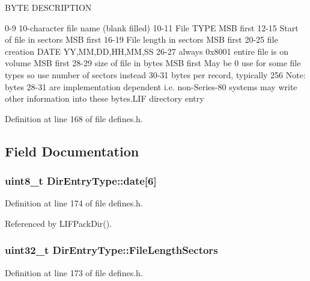 B\+Y\+TE D\+E\+S\+C\+R\+I\+P\+T\+I\+ON 

 0-\/9 10-\/character file name (blank filled) 10-\/11 File T\+Y\+PE M\+SB first 12-\/15 Start of file in sectors M\+SB first 16-\/19 File length in sectors M\+SB first 20-\/25 file creation D\+A\+TE YY,MM,DD,HH,MM,SS 26-\/27 always 0x8001 entire file is on volume M\+SB first 28-\/29 size of file in bytes M\+SB first May be 0 use for some file types so use number of sectors instead 30-\/31 bytes per record, typically 256 Note\+: bytes 28-\/31 are implementation dependent i.\+e. non-\/\+Series-\/80 systems may write other information into these bytes.\+L\+IF directory entry 

Definition at line 168 of file defines.\+h.



\subsection{Field Documentation}
\subsubsection[{\texorpdfstring{date}{date}}]{\setlength{\rightskip}{0pt plus 5cm}uint8\+\_\+t Dir\+Entry\+Type\+::date\mbox{[}6\mbox{]}}\hypertarget{structDirEntryType_a1850264d3e4eac53b665a702ac7000fd}{}\label{structDirEntryType_a1850264d3e4eac53b665a702ac7000fd}


Definition at line 174 of file defines.\+h.



Referenced by L\+I\+F\+Pack\+Dir().

\subsubsection[{\texorpdfstring{File\+Length\+Sectors}{FileLengthSectors}}]{\setlength{\rightskip}{0pt plus 5cm}uint32\+\_\+t Dir\+Entry\+Type\+::\+File\+Length\+Sectors}\hypertarget{structDirEntryType_a0ad3a6b6da198caa68e7e82d025975cb}{}\label{structDirEntryType_a0ad3a6b6da198caa68e7e82d025975cb}


Definition at line 173 of file defines.\+h.



